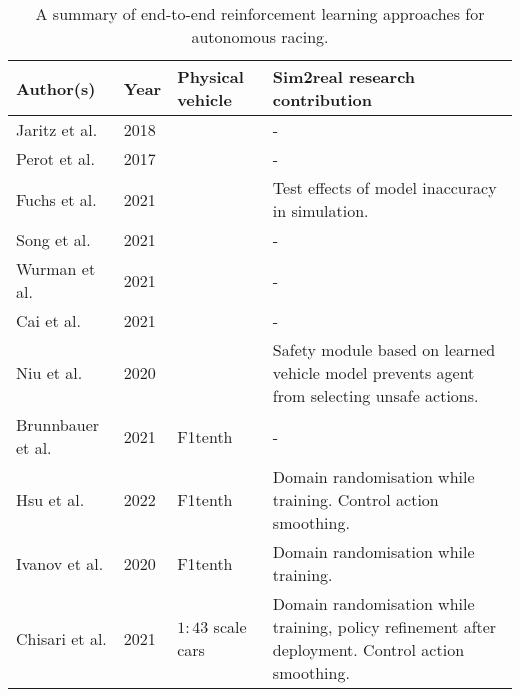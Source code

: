 

\begin{table}[htb!]
\centering
\renewcommand{\arraystretch}{1.5}
\begin{tabularx}{\textwidth}{R Y M L}
    \hline
    \small \textbf{Author(s)} & \small \textbf{Year} & \small \textbf{Physical \mbox{vehicle}} & \small \textbf{Sim2real research contribution} \\
    \hline
   
    \small Jaritz et al. \cite{Jaritz2018} & \small 2018 & & - \\

    \small Perot et al. \cite{Perot2017} & \small  2017 & & - \\

    \small Fuchs et al. \cite{Fuchs2021} & \small 2021 & & \small Test effects of model inaccuracy in simulation. \\

    \small Song et al. \cite{Fuchs2021} & \small 2021 & & - \\

    \small Wurman et al. \cite{Wurman2022} & \small 2021 & & - \\

    \small Cai et al. \cite{Cai2020} & \small 2021 & & - \\

    \small Niu et al. \cite{Niu2020} & \small 2020 & & \small Safety module based on learned vehicle model prevents agent from selecting unsafe actions. \\
    
    \small Brunnbauer et al. \cite{brunnbauer2021} & \small 2021 & F1tenth & - \\

    \small Hsu et al. \cite{hsu2022} & \small 2022 & F1tenth & \small Domain randomisation while training. Control action smoothing. \\

    \small Ivanov et al. \cite{Ivanov2020} & \small 2020 & F1tenth & \small Domain randomisation while training. \\

    \small Chisari et al. \cite{Chisari2021} & \small 2021 & $1:43$ scale cars & \small Domain randomisation while training, policy refinement after deployment. Control action smoothing.\\

    \hline

\end{tabularx}
\caption[A summary of end-to-end reinforcement learning approaches for autonomous racing]{A summary of end-to-end reinforcement learning approaches for autonomous racing. }
\label{table:autonomous_racing_rl_summary}
\end{table} 
